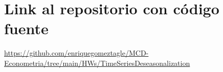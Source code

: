 \documentclass[10pt]{article}
\begin{document}
\section{Link al repositorio con código fuente}
\href{https://github.com/enriquegomeztagle/MCD-Econometria/tree/main/HWs/TimeSeriesDeseasonalization}{https://github.com/enriquegomeztagle/MCD-Econometria/tree/main/HWs/TimeSeriesDeseasonalization}
\end{document}
